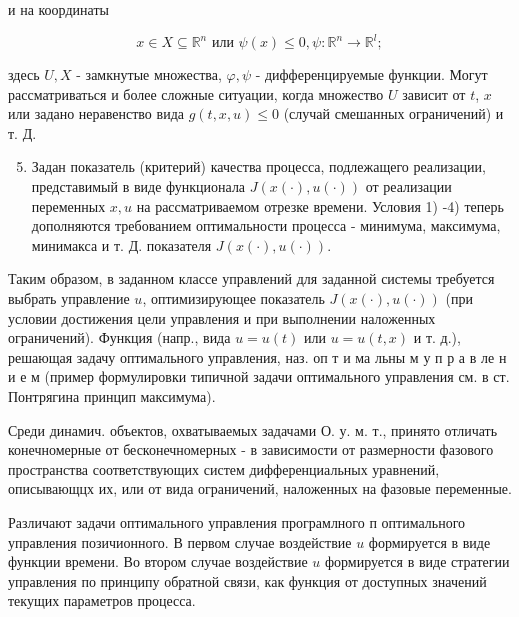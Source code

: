 \documentclass[10pt]{article}
\begin{document}
и на координаты



\[

x \in X \subseteq \mathbb{R}^{n} \text { или } \psi(x) \leqslant 0, \psi: \mathbb{R}^{n} \rightarrow \mathbb{R}^{l} ;

\]



здесь $U, X$ - замкнутые множества, $\varphi, \psi$ - дифференцируемые функции. Могут рассматриваться и более сложные ситуации, когда множество $U$ зависит от $t$, $x$ или задано неравенство вида $g(t, x, u) \leqslant 0$ (случай смешанных ограничений) и т. Д.



\begin{enumerate}

  \setcounter{enumi}{4}

  \item Задан показатель (критерий) качества процесса, подлежащего реализации, представимый в виде функционала $J(x(\cdot), u(\cdot))$ от реализации переменных $x, u$ на рассматриваемом отрезке времени. Условия 1) -4) теперь дополняются требованием оптимальности процесса - минимума, максимума, минимакса и т. Д. показателя $J(x(\cdot), u(\cdot))$.

\end{enumerate}



Таким образом, в заданном классе управлений для заданной системы требуется выбрать управление $u$, оптимизирующее показатель $J(x(\cdot), u(\cdot))$ (при условии достижения цели управления и при выполнении наложенных ограничений). Функция (напр., вида $u=u(t)$ или $u=u(t, x)$ и т. д.), решающая задачу оптимального управления, наз. оп т и ма льны м у п р а в ле н и е м (пример формулировки типичной задачи оптимального управления см. в ст. Понтрягина принцип максимума).



Среди динамич. объектов, охватываемых задачами О. у. м. т., принято отличать конечномерные от бесконечномерных - в зависимости от размерности фазового пространства соответствующих систем дифференциальных уравнений, описывающцх их, или от вида ограничений, наложенных на фазовые переменные.



Различают задачи оптимального управления програмлного п оптимального управления позичионного. В первом случае воздействие $u$ формируется в виде функции времени. Во втором случае воздействие $u$ формируется в виде стратегии управления по принципу обратной связи, как функция от доступных значений текущих параметров процесса.
\end{document}
